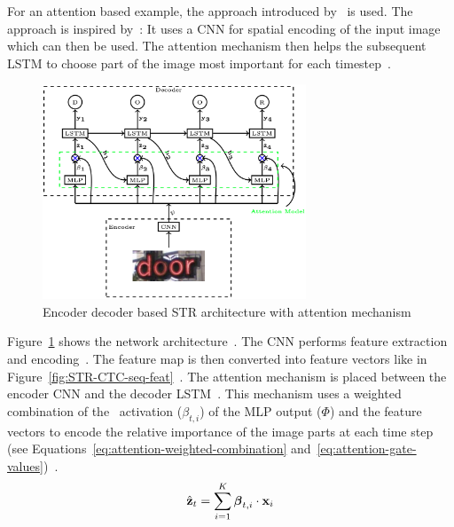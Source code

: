 For an attention based example, the approach introduced by~\cite{ghosh_visual_2017} is used.
The approach is inspired by~\cite{bahdanau_neural_2016,xu_show_2016}: It uses a \ac{CNN} for
spatial encoding of the input image which can then be used.
The attention mechanism then helps the subsequent \ac{LSTM} to choose part of the image most
important for each timestep~\citep{ghosh_visual_2017}.
\begin{figure}[h]
    \centering
    \includegraphics[width=0.7\textwidth]{img/STR-encdec-attention-Gosh-Visual-2017.png}
    \caption[Encoder decoder \& attention based STR architecture]{%
        Encoder decoder based STR architecture with attention
        mechanism~\citep{ghosh_visual_2017}\label{fig:STR-attention}
    }
\end{figure}
Figure~\ref{fig:STR-attention} shows the network architecture~\citep{ghosh_visual_2017}.
The \ac{CNN} performs feature extraction and encoding~\citep{ghosh_visual_2017}.
The feature map is then converted into feature vectors like in
Figure~\ref{fig:STR-CTC-seq-feat}~\citep{ghosh_visual_2017,shi_end--end_2017}.
The attention mechanism is placed between the encoder \ac{CNN} and the decoder
\ac{LSTM}~\citep{ghosh_visual_2017}.
This mechanism uses a weighted combination of the \sfmx\ activation ($\beta_{t,i}$) of the \ac{MLP}
output ($\Phi$) and the feature vectors to encode the relative importance of the image parts at
each time step (see Equations~\ref{eq:attention-weighted-combination}
and~\ref{eq:attention-gate-values})~\citep{ghosh_visual_2017,xu_show_2016}.
\begin{equation}\label{eq:attention-weighted-combination}
    \hat{\textbf{z}}_t=\sum_{i=1}^{K}\boldsymbol{\beta}_{t,i}\cdot \textbf{x}_i
\end{equation}
